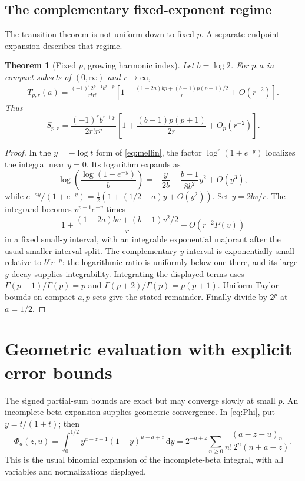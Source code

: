 \documentclass[11pt]{article}
\numberwithin{equation}{section}
\newtheorem{theorem}{Theorem}[section]
\theoremstyle{definition}\newtheorem{definition}[theorem]{Definition}
\theoremstyle{remark}\newtheorem{remark}[theorem]{Remark}
\newcommand{\dd}{\,\mathrm d}
\begin{document}
\subsection{The complementary fixed-exponent regime}
\label{sec:fixedp}
The transition theorem is not uniform down to fixed $p$. A separate endpoint expansion describes that regime.

\begin{theorem}[Fixed $p$, growing harmonic index]\label{thm:fixedp}
Let $b=\log2$. For $p,a$ in compact subsets of $(0,\infty)$ and $r\to\infty$,
\begin{align}\label{eq:fixedp}
 T_{p,r}(a)=\frac{(-1)^r2^{p-1}b^{r+p}}{r!r^p}
 \left[1+\frac{(1-2a)bp+(b-1)p(p+1)/2}{r}+O(r^{-2})\right].
\end{align}
Thus
\begin{equation}\label{eq:fixedpS}
 S_{p,r}=\frac{(-1)^r b^{r+p}}{2r!r^p}
 \left[1+\frac{(b-1)p(p+1)}{2r}+O_p(r^{-2})\right].
\end{equation}
\end{theorem}
\begin{proof}
In the $y=-\log t$ form of \eqref{eq:mellin}, the factor
$\log^r(1+e^{-y})$ localizes the integral near $y=0$. Its logarithm expands as
\[
 \log\left(\frac{\log(1+e^{-y})}{b}\right)
 =-\frac{y}{2b}+\frac{b-1}{8b^2}y^2+O(y^3),
\]
while
$e^{-ay}/(1+e^{-y})=\tfrac12(1+(1/2-a)y+O(y^2))$.
Set $y=2bv/r$. The integrand becomes $v^{p-1}e^{-v}$ times
\[
 1+\frac{(1-2a)bv+(b-1)v^2/2}{r}+O\!\left(r^{-2}P(v)\right)
\]
in a fixed small-$y$ interval, with an integrable exponential majorant after the usual smaller-interval split. The complementary $y$-interval is exponentially small relative to $b^r r^{-p}$: the logarithmic ratio is uniformly below one there, and its large-$y$ decay supplies integrability. Integrating the displayed terms uses
$\Gamma(p+1)/\Gamma(p)=p$ and $\Gamma(p+2)/\Gamma(p)=p(p+1)$. Uniform Taylor bounds on compact $a,p$-sets give the stated remainder. Finally divide by $2^p$ at $a=1/2$.
\end{proof}

\section{Geometric evaluation with explicit error bounds}
\label{sec:certification}

The signed partial-sum bounds are exact but may converge slowly at small $p$. An incomplete-beta expansion supplies geometric convergence. In \eqref{eq:Phi}, put $y=t/(1+t)$; then
\begin{equation}\label{eq:incomplete}
 \Phi_a(z,u)=\int_0^{1/2}y^{a-z-1}(1-y)^{u-a+z}\dd y
 =2^{-a+z}\sum_{n\ge0}
 \frac{(a-z-u)_n}{n!\,2^n(n+a-z)}.
\end{equation}
This is the usual binomial expansion of the incomplete-beta integral, with all variables and normalizations displayed.
\end{document}
